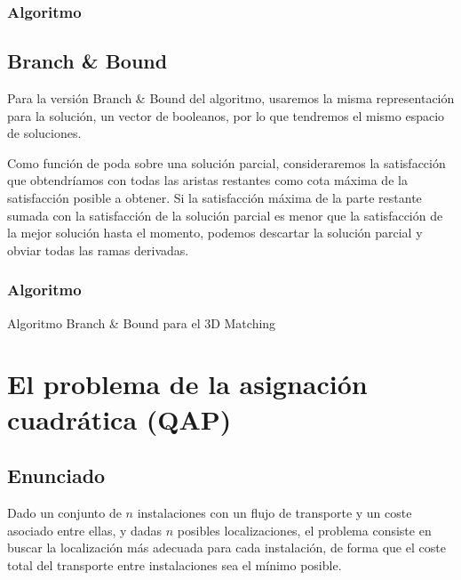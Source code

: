 \documentclass[a4paper, 11pt]{article} %
\begin{document}
  \subsubsection{Algoritmo}

        \small
  	\texttt{}
        \normalsize
  
  \subsection{Branch \& Bound}
  
    Para la versión Branch \& Bound del algoritmo, usaremos la misma representación para la solución, un vector de booleanos, por lo que tendremos el mismo espacio de soluciones.
    
    Como función de poda sobre una solución parcial, consideraremos la satisfacción que obtendríamos con todas las aristas restantes como cota máxima de la satisfacción posible a obtener. Si la satisfacción máxima de la parte restante sumada con la satisfacción de la solución parcial es menor que la satisfacción de la mejor solución hasta el momento, podemos descartar la solución parcial y obviar todas las ramas derivadas. 
    
  \subsubsection{Algoritmo}
    \begin{algorithm}[H]
    	\begin{algorithmic}[1]
		\REQUIRE 
    	\end{algorithmic}
        \caption{Algoritmo Branch \& Bound para el 3D Matching}
        \label{BBound-3DMatch}
    \end{algorithm}
  

\section{El problema de la asignación cuadrática (QAP)}
  \subsection{Enunciado}
    Dado un conjunto de $n$ instalaciones con un flujo de transporte y un coste asociado entre ellas, y dadas $n$ posibles 
    localizaciones, el problema consiste en buscar la localización más adecuada para cada instalación, de forma que el 
    coste total del transporte entre instalaciones sea el mínimo posible. 
\end{document}
